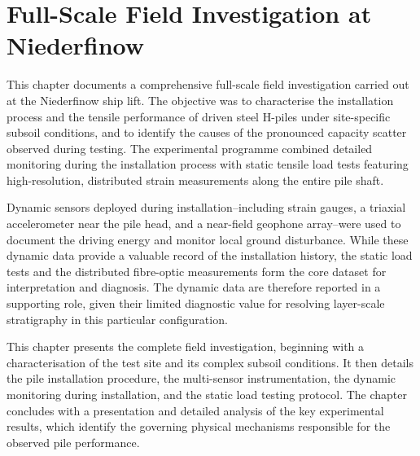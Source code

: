 \chapter{Full-Scale Field Investigation at Niederfinow}
\label{chap:field_investigation}


This chapter documents a comprehensive full-scale field investigation carried out at the Niederfinow ship lift. The objective was to characterise the installation process and the tensile performance of driven steel H-piles under site-specific subsoil conditions, and to identify the causes of the pronounced capacity scatter observed during testing.
The experimental programme combined detailed monitoring during the installation process with static tensile load tests featuring high-resolution, distributed strain measurements along the entire pile shaft.

Dynamic sensors deployed during installation--including strain gauges, a triaxial accelerometer near the pile head, and a near-field geophone array--were used to document the driving energy and monitor local ground disturbance. While these dynamic data provide a valuable record of the installation history, the static load tests and the distributed fibre-optic measurements form the core dataset for interpretation and diagnosis. The dynamic data are therefore reported in a supporting role, given their limited diagnostic value for resolving layer-scale stratigraphy in this particular configuration.

This chapter presents the complete field investigation, beginning with a characterisation of the test site and its complex subsoil conditions. It then details the pile installation procedure, the multi-sensor instrumentation, the dynamic monitoring during installation, and the static load testing protocol. The chapter concludes with a presentation and detailed analysis of the key experimental results, which identify the governing physical mechanisms responsible for the observed pile performance.

